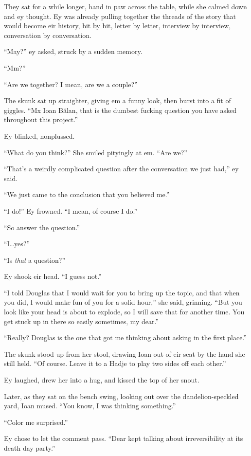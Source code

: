They sat for a while longer, hand in paw across the table, while she calmed down and ey thought. Ey was already pulling together the threads of the story that would become eir history, bit by bit, letter by letter, interview by interview, conversation by conversation.

``May?'' ey asked, struck by a sudden memory.

``Mm?''

``Are we together? I mean, are we a couple?''

The skunk sat up straighter, giving em a funny look, then burst into a fit of giggles. ``Mx Ioan Bălan, that is the dumbest fucking question you have asked throughout this project.''

Ey blinked, nonplussed.

``What do you think?'' She smiled pityingly at em. ``Are we?''

``That's a weirdly complicated question after the conversation we just had,'' ey said.

``We just came to the conclusion that you believed me.''

``I do!'' Ey frowned. ``I mean, of course I do.''

``So answer the question.''

``I\ldots yes?''

``Is \emph{that} a question?''

Ey shook eir head. ``I guess not.''

``I told Douglas that I would wait for you to bring up the topic, and that when you did, I would make fun of you for a solid hour,'' she said, grinning. ``But you look like your head is about to explode, so I will save that for another time. You get stuck up in there so easily sometimes, my dear.''

``Really? Douglas is the one that got me thinking about asking in the first place.''

The skunk stood up from her stool, drawing Ioan out of eir seat by the hand she still held. ``Of course. Leave it to a Hadje to play two sides off each other.''

Ey laughed, drew her into a hug, and kissed the top of her snout.

Later, as they sat on the bench swing, looking out over the dandelion-speckled yard, Ioan mused. ``You know, I was thinking something.''

``Color me surprised.''

Ey chose to let the comment pass. ``Dear kept talking about irreversibility at its death day party.''


